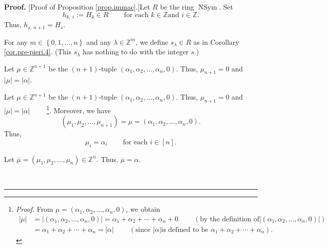 \documentclass[numbers=enddot,12pt,final,onecolumn,notitlepage,english]{scrartcl}%
\theoremstyle{definition}
\newenvironment{proof}[1][Proof]{\noindent\textbf{#1.} }{\ \rule{0.5em}{0.5em}}
\newenvironment{verlong}{}{}
\newenvironment{vershort}{}{}
\begin{document}
\begin{proof}
[Proof of Proposition \ref{prop.immac}.]Let $R$ be the ring
$\operatorname*{NSym}$. Set%
\[
h_{k,\ i}:=H_{k}\in R\ \ \ \ \ \ \ \ \ \ \text{for each }k\in\mathbb{Z}\text{
and }i\in\mathbb{Z}.
\]
Thus, $h_{s,\ n+1}=H_{s}$.

For any $m\in\left\{  0,1,\ldots,n\right\}  $ and any $\lambda\in
\mathbb{Z}^{m}$, we define $s_{\lambda}\in R$ as in Corollary
\ref{cor.pre-pieri.4}. (This $s_{\lambda}$ has nothing to do with the integer
$s$.)

\begin{vershort}
Let $\mu\in\mathbb{Z}^{n+1}$ be the $\left(  n+1\right)  $-tuple $\left(
\alpha_{1},\alpha_{2},\ldots,\alpha_{n},0\right)  $. Thus, $\mu_{n+1}=0$ and
$\left\vert \mu\right\vert =\left\vert \alpha\right\vert $.
\end{vershort}

\begin{verlong}
Let $\mu\in\mathbb{Z}^{n+1}$ be the $\left(  n+1\right)  $-tuple $\left(
\alpha_{1},\alpha_{2},\ldots,\alpha_{n},0\right)  $. Thus, $\mu_{n+1}=0$ and
$\left\vert \mu\right\vert =\left\vert \alpha\right\vert $%
\ \ \ \ \footnote{\textit{Proof.} From $\mu=\left(  \alpha_{1},\alpha
_{2},\ldots,\alpha_{n},0\right)  $, we obtain%
\begin{align*}
\left\vert \mu\right\vert  &  =\left\vert \left(  \alpha_{1},\alpha_{2}%
,\ldots,\alpha_{n},0\right)  \right\vert =\alpha_{1}+\alpha_{2}+\cdots
+\alpha_{n}+0\ \ \ \ \ \ \ \ \ \ \left(  \text{by the definition of
}\left\vert \left(  \alpha_{1},\alpha_{2},\ldots,\alpha_{n},0\right)
\right\vert \right) \\
&  =\alpha_{1}+\alpha_{2}+\cdots+\alpha_{n}=\left\vert \alpha\right\vert
\ \ \ \ \ \ \ \ \ \ \left(  \text{since }\left\vert \alpha\right\vert \text{
is defined to be }\alpha_{1}+\alpha_{2}+\cdots+\alpha_{n}\right)  .
\end{align*}
}. Moreover, we have%
\[
\left(  \mu_{1},\mu_{2},\ldots,\mu_{n+1}\right)  =\mu=\left(  \alpha
_{1},\alpha_{2},\ldots,\alpha_{n},0\right)  .
\]
Thus,%
\begin{equation}
\mu_{i}=\alpha_{i}\ \ \ \ \ \ \ \ \ \ \text{for each }i\in\left[  n\right]  .
\label{pf.prop.immac.mui=}%
\end{equation}

\end{verlong}

\begin{vershort}
Let $\overline{\mu}=\left(  \mu_{1},\mu_{2},\ldots,\mu_{n}\right)
\in\mathbb{Z}^{n}$. Thus, $\overline{\mu}=\alpha$.
\end{vershort}


\end{proof}
\end{document}
